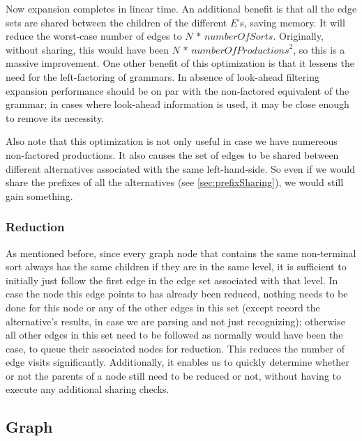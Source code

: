 \documentclass[a4paper,10pt]{article}
\begin{document}
Now expansion completes in linear time. An additional benefit is that all the edge sets are shared between the children of the different $E$'s, saving memory. It will reduce the worst-case number of edges to $N\,*\,\mathit{numberOfSorts}$. Originally, without sharing, this would have been $N\,*\,\mathit{numberOfProductions}^2$, so this is a massive improvement. One other benefit of this optimization is that it lessens the need for the left-factoring of grammars. In absence of look-ahead filtering expansion performance should be on par with the non-factored equivalent of the grammar; in cases where look-ahead information is used, it may be close enough to remove its necessity.

Also note that this optimization is not only useful in case we have numereous non-factored productions. It also causes the set of edges to be shared between different alternatives associated with the same left-hand-side. So even if we would share the prefixes of all the alternatives (see \ref{sec:prefixSharing}), we would still gain something.

\subsubsection{Reduction}
\label{subsec:edgeVisitOptimization}
As mentioned before, since every graph node that contains the same non-terminal sort always has the same children if they are in the same level, it is sufficient to initially just follow the first edge in the edge set associated with that level. In case the node this edge points to has already been reduced, nothing needs to be done for this node or any of the other edges in this set (except record the alternative's results, in case we are parsing and not just recognizing); otherwise all other edges in this set need to be followed as normally would have been the case, to queue their associated nodes for reduction. This reduces the number of edge visits significantly. Additionally, it enables us to quickly determine whether or not the parents of a node still need to be reduced or not, without having to execute any additional sharing checks.

\subsection{Graph}
\end{document}
